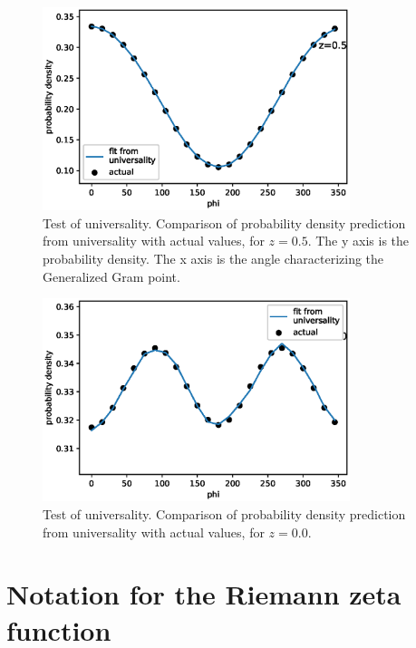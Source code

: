 \documentclass[twoside]{article}
\begin{document}
\begin{figure}
\centering
\includegraphics[width=0.8\textwidth]{z05.eps}
\caption[]{ 
 Test of universality. Comparison of probability density prediction from
 universality with actual values, for $z=0.5$. The y axis is the probability density.
 The x axis is the angle characterizing the Generalized Gram point.
  }
\vspace{1mm}
\label{z05}
\end{figure}

\begin{figure}
\centering
\includegraphics[width=0.8\textwidth]{z00.eps}
\caption[]{ 
 Test of universality. Comparison of probability density prediction from
 universality with actual values, for $z=0.0$. 
  }
\vspace{1mm}
\label{z00}
\end{figure}

\section{\label{sec2}Notation for the Riemann zeta function}
\end{document}
